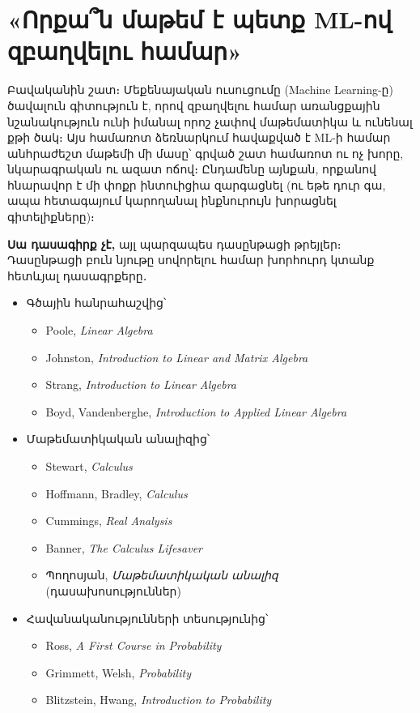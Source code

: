

\chapter*{«Որքա՞ն մաթեմ է պետք {\bf ML}-ով զբաղվելու համար»}

Բավականին շատ։ 
Մեքենայական ուսուցումը ({\rm Machine Learning}-ը) ծավալուն գիտություն է, որով զբաղվելու համար առանցքային նշանակություն ունի իմանալ որոշ չափով մաթեմատիկա և ունենալ քթի ծակ։ 
Այս համառոտ ձեռնարկում հավաքված է {\rm ML}-ի համար անհրաժեշտ մաթեմի մի մասը՝ գրված շատ համառոտ ու ոչ խորը, նկարագրական ու ազատ ոճով։ Ընդամենը այնքան, որքանով հնարավոր է մի փոքր ինտուիցիա զարգացնել (ու եթե դուր գա, ապա հետագայում կարողանալ ինքնուրույն խորացնել գիտելիքները)։ 

\textbf{Սա դասագիրք չէ,} այլ պարզապես դասընթացի թրեյլեր։ Դասընթացի բուն նյութը սովորելու համար խոր\-հուրդ կտանք հետևյալ դասագրքերը․
\begin{itemize}
\item Գծային հանրահաշվից՝
\begin{itemize}
    \item[-] {\rm Poole, \textit{Linear Algebra}}
    \item[-] {\rm Johnston, \textit{Introduction to Linear and Matrix Algebra}}
    \item[-] {\rm Strang, \textit{Introduction to Linear Algebra}}
    \item[-] {\rm Boyd, Vandenberghe, \textit{Introduction to Applied Linear Algebra}}
\end{itemize}

\item Մաթեմատիկական անալիզից՝
\begin{itemize}
    \item[-] {\rm Stewart, \textit{Calculus}}
    \item[-] {\rm Hoffmann, Bradley, \textit{Calculus}}
    \item[-] {\rm Cummings, \textit{Real Analysis}}
    \item[-] {\rm Banner, \textit{The Calculus Lifesaver}}
    \item[-] Պողոսյան, \textit{Մաթեմատիկական անալիզ} (դասախոսություններ)
\end{itemize}

\item Հավանականությունների տեսությունից՝
\begin{itemize}
    \item[-] {\rm Ross, \textit{A First Course in Probability}}
    \item[-] {\rm Grimmett, Welsh, \textit{Probability}}
    \item[-] {\rm Blitzstein, Hwang, \textit{Introduction to Probability}}
\end{itemize}
\end{itemize}

